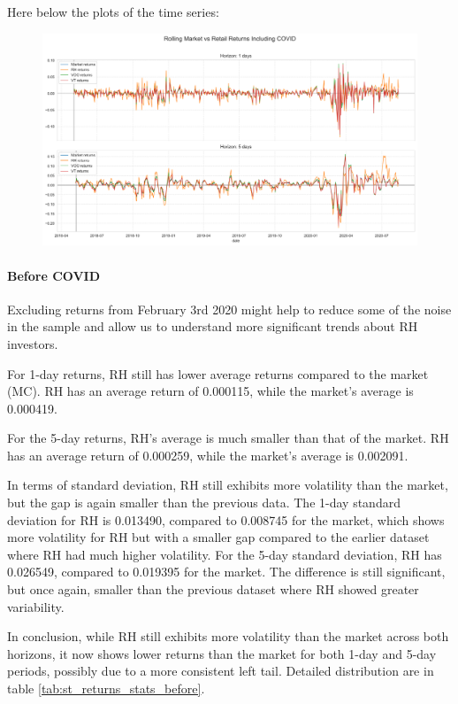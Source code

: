 Here below the plots of the time series:
\begin{figure}[H]
    \centering
    \includegraphics[width=1\linewidth]{../images/ts_including_1_5.png}
\end{figure}


\paragraph{Before COVID}
Excluding returns from February 3rd 2020 might help to reduce some of the noise in the sample and allow us to understand more significant trends about RH investors.

For 1-day returns, RH still has lower average returns compared to the market (MC). 
RH has an average return of 0.000115, while the market's average is 0.000419.

For the 5-day returns, RH's average is much smaller than that of the market. 
RH has an average return of 0.000259, while the market's average is 0.002091. 

In terms of standard deviation, RH still exhibits more volatility than the market, but the gap is again smaller than the previous data.
The 1-day standard deviation for RH is 0.013490, compared to 0.008745 for the market, which shows more volatility for RH but with a smaller gap compared to the earlier dataset where RH had much higher volatility.
For the 5-day standard deviation, RH has 0.026549, compared to 0.019395 for the market. The difference is still significant, but once again, smaller than the previous dataset where RH showed greater variability.

In conclusion, while RH still exhibits more volatility than the market across both horizons, it now shows lower returns than the market for both 1-day and 5-day periods, possibly due to a more consistent left tail.
Detailed distribution are in table \ref{tab:st_returns_stats_before}.

